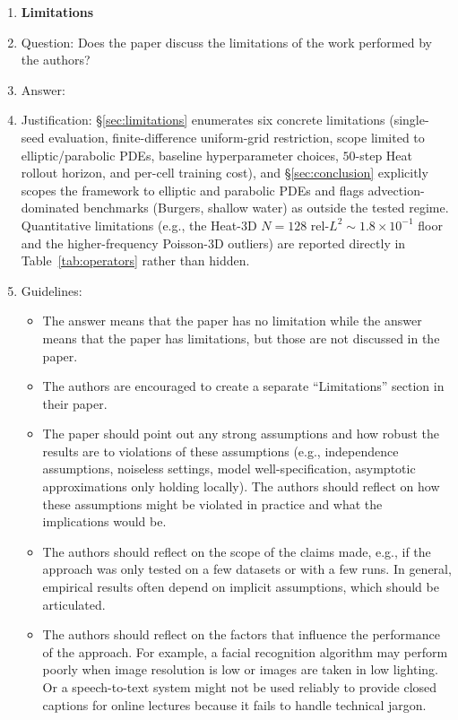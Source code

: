 \begin{enumerate}
\item {\bf Limitations}
    \item[] Question: Does the paper discuss the limitations of the work performed by the authors?
    \item[] Answer: \answerYes{}
    \item[] Justification: \S\ref{sec:limitations} enumerates six concrete limitations (single-seed evaluation, finite-difference uniform-grid restriction, scope limited to elliptic/parabolic PDEs, baseline hyperparameter choices, $50$-step Heat rollout horizon, and per-cell training cost), and \S\ref{sec:conclusion} explicitly scopes the framework to elliptic and parabolic PDEs and flags advection-dominated benchmarks (Burgers, shallow water) as outside the tested regime. Quantitative limitations (e.g., the Heat-3D $N{=}128$ rel-$L^2 \sim 1.8\times 10^{-1}$ floor and the higher-frequency Poisson-3D outliers) are reported directly in Table~\ref{tab:operators} rather than hidden.
    \item[] Guidelines:
    \begin{itemize}
        \item The answer \answerNA{} means that the paper has no limitation while the answer \answerNo{} means that the paper has limitations, but those are not discussed in the paper. 
        \item The authors are encouraged to create a separate ``Limitations'' section in their paper.
        \item The paper should point out any strong assumptions and how robust the results are to violations of these assumptions (e.g., independence assumptions, noiseless settings, model well-specification, asymptotic approximations only holding locally). The authors should reflect on how these assumptions might be violated in practice and what the implications would be.
        \item The authors should reflect on the scope of the claims made, e.g., if the approach was only tested on a few datasets or with a few runs. In general, empirical results often depend on implicit assumptions, which should be articulated.
        \item The authors should reflect on the factors that influence the performance of the approach. For example, a facial recognition algorithm may perform poorly when image resolution is low or images are taken in low lighting. Or a speech-to-text system might not be used reliably to provide closed captions for online lectures because it fails to handle technical jargon.

\end{itemize}
\end{enumerate}
